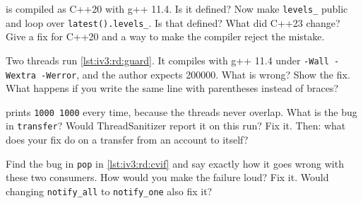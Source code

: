 \begin{question}\label{iq:iv3:reading-debugging-and-software-design:12}
 is compiled as C++20 with g++ 11.4. Is it defined? Now make \texttt{levels\_} public and loop over \texttt{latest().levels\_}. Is that defined? What did C++23 change? Give a fix for C++20 and a way to make the compiler reject the mistake.
\label{lst:iv3:rd:temprange}
\end{question}

\begin{question}\label{iq:iv3:reading-debugging-and-software-design:13}
Two threads run \cref{lst:iv3:rd:guard}. It compiles with g++ 11.4 under \texttt{-Wall -Wextra -Werror}, and the author expects 200000. What is wrong? Show the fix. What happens if you write the same line with parentheses instead of braces?
\label{lst:iv3:rd:guard}
\end{question}

\begin{question}\label{iq:iv3:reading-debugging-and-software-design:14}
 prints \texttt{1000 1000} every time, because the threads never overlap. What is the bug in \texttt{transfer}? Would ThreadSanitizer report it on this run? Fix it. Then: what does your fix do on a transfer from an account to itself?
\label{lst:iv3:rd:lockorder}
\end{question}

\begin{question}\label{iq:iv3:reading-debugging-and-software-design:15}
Find the bug in \texttt{pop} in \cref{lst:iv3:rd:cvif} and say exactly how it goes wrong with these two consumers. How would you make the failure loud? Fix it. Would changing \texttt{notify\_all} to \texttt{notify\_one} also fix it?
\label{lst:iv3:rd:cvif}
\end{question}

